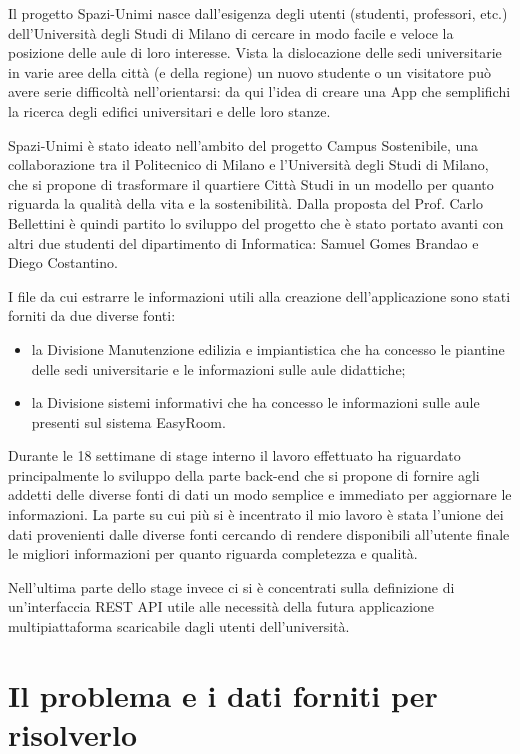 \documentclass[12pt]{report}
\begin{document}
Il progetto Spazi-Unimi nasce dall’esigenza degli utenti (studenti, professori, etc.) dell’Università degli Studi di Milano di cercare in modo facile e veloce la posizione delle aule di loro interesse. 
Vista la dislocazione delle sedi universitarie in varie aree della città (e della regione) un nuovo studente o un visitatore può avere serie difficoltà nell’orientarsi: da qui l’idea di creare una App che semplifichi la ricerca degli edifici universitari e delle loro stanze. 

Spazi-Unimi è stato ideato nell’ambito del progetto Campus Sostenibile, una collaborazione tra il Politecnico di Milano e l’Università degli Studi di Milano, che si propone di trasformare il quartiere Città Studi in un modello per quanto riguarda la qualità della vita e la sostenibilità.
Dalla proposta del Prof. Carlo Bellettini è quindi partito lo sviluppo del progetto che è stato portato avanti con altri due studenti del dipartimento di Informatica: Samuel Gomes Brandao e Diego Costantino.

I file da cui estrarre le informazioni utili alla creazione dell'applicazione sono stati forniti da due diverse fonti:
\begin{itemize}
\item la Divisione Manutenzione edilizia e impiantistica che ha concesso le piantine delle sedi universitarie e le informazioni sulle aule didattiche;
\item la Divisione sistemi informativi che ha concesso le informazioni sulle aule presenti sul sistema EasyRoom.
\end{itemize}

Durante le 18 settimane di stage interno il lavoro effettuato ha riguardato principalmente lo sviluppo della parte back-end che si propone di fornire agli addetti delle diverse fonti di dati un modo semplice e immediato per aggiornare le informazioni.
La parte su cui più si è incentrato il mio lavoro è stata l'unione dei dati provenienti dalle diverse fonti cercando di rendere disponibili all'utente finale le migliori informazioni per quanto riguarda completezza e qualità.

Nell'ultima parte dello stage invece ci si è concentrati sulla definizione di un'interfaccia REST API utile alle necessità della futura applicazione multipiattaforma scaricabile dagli utenti dell'università.


\newpage
\section{Il problema e i dati forniti per risolverlo}
\end{document}
